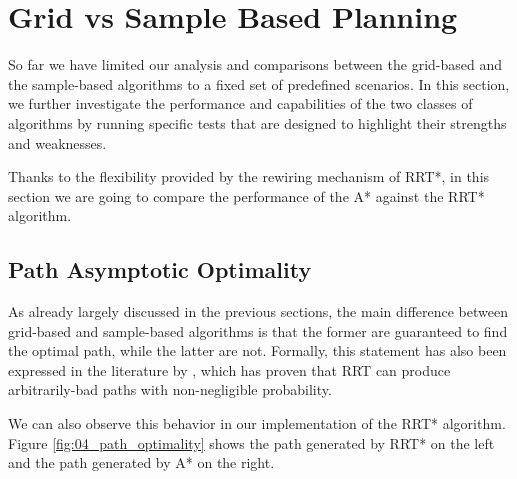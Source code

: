 \section{Grid vs Sample Based Planning}
\label{sec:grid_vs_sample_based_planning}

So far we have limited our analysis and comparisons between the grid-based and the sample-based algorithms to a fixed set of predefined scenarios.
In this section, we further investigate the performance and capabilities of the two classes of algorithms by running specific tests that are designed to highlight their strengths and weaknesses.

Thanks to the flexibility provided by the rewiring mechanism of RRT*, in this section we are going to compare the performance of the A* against the RRT* algorithm.


\subsection{Path Asymptotic Optimality}
\label{subsec:path_optimality}

As already largely discussed in the previous sections, the main difference between grid-based and sample-based algorithms is that the former are guaranteed to find the optimal path, while the latter are not.
Formally, this statement has also been expressed in the literature by \cite{rrt_optimality}, which has proven that RRT can produce arbitrarily-bad paths with non-negligible probability.

We can also observe this behavior in our implementation of the RRT* algorithm.
Figure \ref{fig:04_path_optimality} shows the path generated by RRT* on the left and the path generated by A* on the right.

